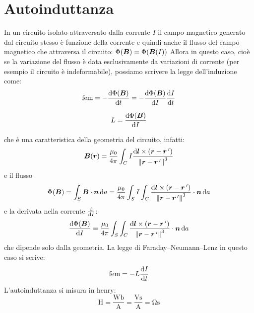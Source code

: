 \section{Autoinduttanza}
In un circuito isolato attraversato dalla corrente $I$ il campo magnetico generato dal circuito stesso è funzione della corrente e quindi anche il flusso del campo magnetico che attraversa il circuito: $\Phi(\boldsymbol{B})=\Phi(\boldsymbol{B}(I))$
Allora in questo caso, cioè se la variazione del flusso è data esclusivamente da variazioni di corrente (per esempio il circuito è indeformabile), possiamo scrivere la legge dell'induzione come:
\begin{equation}
  \text{fem}=-\frac{\mathrm{d}\Phi(\boldsymbol{B})}{\mathrm{d} t}=-\frac{\mathrm{d}\Phi(\boldsymbol{B})}{\mathrm{d} I}\frac{\mathrm{d} I}{\mathrm{d} t}
\end{equation}
\begin{Def}
  \begin{equation}
    L=\frac{\mathrm{d}\Phi(\boldsymbol{B})}{\mathrm{d} I}
  \end{equation}
\end{Def}
che è una caratteristica della geometria del circuito, infatti:
\[
  \boldsymbol{B}(\boldsymbol{r})=\frac{\mu_0}{4\pi}\int_C I\frac{\mathrm{d} \boldsymbol{l}\times\left(\boldsymbol{r}-\boldsymbol{r}\,'\right)}{\left\lVert\boldsymbol{r}-\boldsymbol{r}\,'\right\rVert^3}
\]
e il flusso
\[
  \Phi(\boldsymbol{B})=\int_S \boldsymbol{B}\cdot\boldsymbol{n}\,\mathrm{d} a = \frac{\mu_0}{4\pi}\int_S I\int_C\frac{\mathrm{d} \boldsymbol{l}\times\left(\boldsymbol{r}-\boldsymbol{r}\,'\right)}{\left\lVert\boldsymbol{r}-\boldsymbol{r}\,'\right\rVert^3}\cdot \boldsymbol{n}\,\mathrm{d} a
\]
e la derivata nella corrente $\frac{\mathrm{d}}{\mathrm{d} I}$:
\[
  \frac{\mathrm{d}\Phi(\boldsymbol{B})}{\mathrm{d} I}=\frac{\mu_0}{4\pi}\int_S\int_C\frac{\mathrm{d} \boldsymbol{l}\times\left(\boldsymbol{r}-\boldsymbol{r}\,'\right)}{\left\lVert\boldsymbol{r}-\boldsymbol{r}\,'\right\rVert^3}\cdot \boldsymbol{n}\,\mathrm{d} a
\]
che dipende solo dalla geometria. La legge di Faraday--Neumann--Lenz in questo caso si scrive:
\begin{equation}
  \text{fem}=-L\frac{\mathrm{d} I}{\mathrm{d} t}
\end{equation}
L'autoinduttanza si misura in henry:
\[
  \si{\henry}=\frac{\si{\weber}}{\si{\ampere}}=\frac{\si{\volt\second}}{\si{\ampere}}=\si{\ohm\second}
\]
